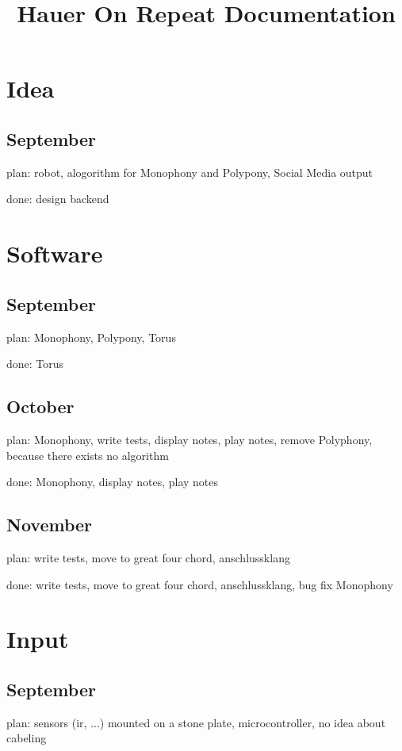 \documentclass[a4paper]{scrartcl}
\title{Hauer On Repeat Documentation}
\begin{document}
	
\maketitle

\newpage
{}
\tableofcontents
\newpage

\section{Idea}
\subsection{September}
plan: robot, alogorithm for Monophony and Polypony, Social Media output

\noindent
done: design backend

\section{Software}
\subsection{September}
plan: Monophony, Polypony, Torus

\noindent
done: Torus

\subsection{October}
plan: Monophony, write tests, display notes, play notes, remove Polyphony, because there exists no algorithm

\noindent
done: Monophony, display notes, play notes

\subsection{November}
plan: write tests, move to great four chord, anschlussklang

\noindent
done: write tests, move to great four chord, anschlussklang, bug fix Monophony

\section{Input}
\subsection{September}
plan: sensors (ir, ...) mounted on a stone plate, microcontroller, no idea about cabeling
\end{document}
